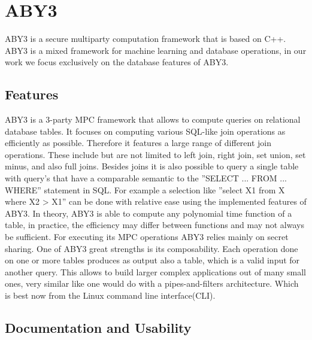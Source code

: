 \section{ABY3}
ABY3 \cite{mohassel2020fast} is a secure multiparty computation framework that is based on C++. ABY3 is a mixed framework for machine learning and database operations, in our work we focus exclusively on the database features of ABY3. 
\subsection{Features}
ABY3 is a 3-party MPC framework that allows to compute queries on relational database tables. It focuses on computing various SQL-like join operations as efficiently as possible. Therefore it features a large range of different join operations. These include but are not limited to left join, right join, set union, set minus, and also full joins.  
Besides joins it is also possible to query a single table with query's that have a comparable semantic to the ''SELECT ... FROM ... WHERE'' statement in SQL. For example a selection like ''select X1 from X  where X2 > X1'' can be done with relative ease using the implemented features of ABY3. In theory, ABY3 is able to compute any polynomial time function of a table, in practice, the efficiency may differ between functions and may not always be sufficient. For executing its MPC operations ABY3 relies mainly on secret sharing. 
One of ABY3 great strengths is its composability. 
Each operation done on one or more tables produces as output also a table, which is a valid input for another query. This allows to build larger complex applications out of many small ones, very similar like one would do with a pipes-and-filters architecture. Which is best now from the Linux command line interface(CLI). 

\subsection{Documentation and Usability}

